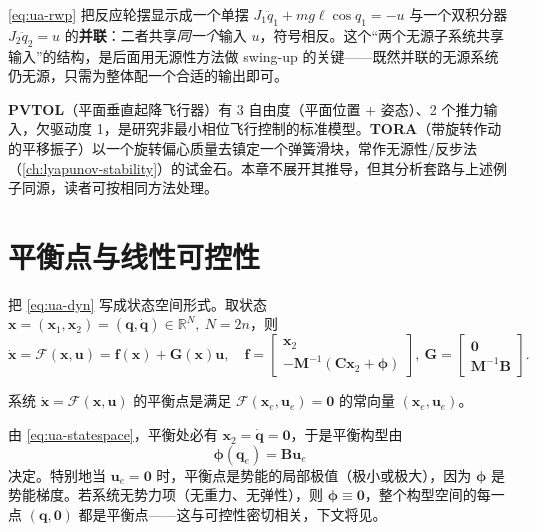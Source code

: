 \begin{insight}[反应轮摆 $=$ 单摆 $\oplus$ 双积分器（并联）]
\cref{eq:ua-rwp} 把反应轮摆显示成一个单摆 $J_1\ddot{q}_1+mg\ell\cos q_1=-u$ 与一个双积分器 $J_2\ddot{q}_2=u$ 的\textbf{并联}：二者共享\emph{同一个}输入 $u$，符号相反。这个“两个无源子系统共享输入”的结构，是后面用无源性方法做 swing-up 的关键——既然并联的无源系统仍无源，只需为整体配一个合适的输出即可。
\end{insight}

\begin{note}[再点两个常被引用的例子]
\textbf{PVTOL}（平面垂直起降飞行器）有 3 自由度（平面位置 $+$ 姿态）、2 个推力输入，欠驱动度 1，是研究非最小相位飞行控制的标准模型。\textbf{TORA}（带旋转作动的平移振子）以一个旋转偏心质量去镇定一个弹簧滑块，常作无源性/反步法（\cref{ch:lyapunov-stability}）的试金石。本章不展开其推导，但其分析套路与上述例子同源，读者可按相同方法处理。
\end{note}

\section{平衡点与线性可控性}\label{sec:ua-controllability}

把 \cref{eq:ua-dyn} 写成状态空间形式。取状态 $\mathbf{x}=(\mathbf{x}_1,\mathbf{x}_2)=(\mathbf{q},\dot{\mathbf{q}})\in\mathbb{R}^{N},\ N=2n$，则
\begin{equation}\label{eq:ua-statespace}
  \dot{\mathbf{x}}=\boldsymbol{\mathcal{F}}(\mathbf{x},\mathbf{u})=\mathbf{f}(\mathbf{x})+\mathbf{G}(\mathbf{x})\mathbf{u},\quad
  \mathbf{f}=\begin{bmatrix}\mathbf{x}_2\\-\mathbf{M}^{-1}(\mathbf{C}\mathbf{x}_2+\boldsymbol{\phi})\end{bmatrix},\
  \mathbf{G}=\begin{bmatrix}\mathbf{0}\\\mathbf{M}^{-1}\mathbf{B}\end{bmatrix}.
\end{equation}

\begin{definition}[平衡点]\label{def:ua-equilibrium}
系统 $\dot{\mathbf{x}}=\boldsymbol{\mathcal{F}}(\mathbf{x},\mathbf{u})$ 的平衡点是满足 $\boldsymbol{\mathcal{F}}(\mathbf{x}_e,\mathbf{u}_e)=\mathbf{0}$ 的常向量 $(\mathbf{x}_e,\mathbf{u}_e)$。
\end{definition}

由 \cref{eq:ua-statespace}，平衡处必有 $\mathbf{x}_2=\dot{\mathbf{q}}=\mathbf{0}$，于是平衡构型由
\begin{equation}\label{eq:ua-eqcond}
  \boldsymbol{\phi}(\mathbf{q}_e)=\mathbf{B}\mathbf{u}_e
\end{equation}
决定。特别地当 $\mathbf{u}_e=\mathbf{0}$ 时，平衡点是势能的局部极值（极小或极大），因为 $\boldsymbol{\phi}$ 是势能梯度。若系统无势力项（无重力、无弹性），则 $\boldsymbol{\phi}\equiv\mathbf{0}$，整个构型空间的每一点 $(\mathbf{q},\mathbf{0})$ 都是平衡点——这与可控性密切相关，下文将见。

